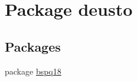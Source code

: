 \hypertarget{namespacedeusto}{}\section{Package deusto}
\label{namespacedeusto}
\subsection*{Packages}
\begin{DoxyCompactItemize}
\item 
package \mbox{\hyperlink{namespacedeusto_1_1bspq18}{bspq18}}
\end{DoxyCompactItemize}
